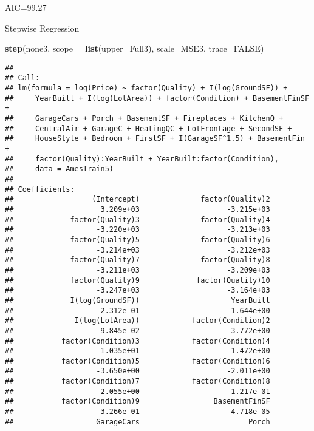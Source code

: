 \documentclass[
]{article}
\newenvironment{Shaded}{\begin{snugshade}}{\end{snugshade}}
\newcommand{\DataTypeTok}[1]{\textcolor[rgb]{0.13,0.29,0.53}{#1}}
\newcommand{\KeywordTok}[1]{\textcolor[rgb]{0.13,0.29,0.53}{\textbf{#1}}}
\newcommand{\NormalTok}[1]{#1}
\newcommand{\OtherTok}[1]{\textcolor[rgb]{0.56,0.35,0.01}{#1}}
\begin{document}
AIC=99.27

Stepwise Regression

\begin{Shaded}
\begin{Highlighting}[]
\KeywordTok{step}\NormalTok{(none3, }\DataTypeTok{scope =} \KeywordTok{list}\NormalTok{(}\DataTypeTok{upper=}\NormalTok{Full3), }\DataTypeTok{scale=}\NormalTok{MSE3, }\DataTypeTok{trace=}\OtherTok{FALSE}\NormalTok{)}
\end{Highlighting}
\end{Shaded}

\begin{verbatim}
## 
## Call:
## lm(formula = log(Price) ~ factor(Quality) + I(log(GroundSF)) + 
##     YearBuilt + I(log(LotArea)) + factor(Condition) + BasementFinSF + 
##     GarageCars + Porch + BasementSF + Fireplaces + KitchenQ + 
##     CentralAir + GarageC + HeatingQC + LotFrontage + SecondSF + 
##     HouseStyle + Bedroom + FirstSF + I(GarageSF^1.5) + BasementFin + 
##     factor(Quality):YearBuilt + YearBuilt:factor(Condition), 
##     data = AmesTrain5)
## 
## Coefficients:
##                  (Intercept)              factor(Quality)2  
##                    3.209e+03                    -3.215e+03  
##             factor(Quality)3              factor(Quality)4  
##                   -3.220e+03                    -3.213e+03  
##             factor(Quality)5              factor(Quality)6  
##                   -3.214e+03                    -3.212e+03  
##             factor(Quality)7              factor(Quality)8  
##                   -3.211e+03                    -3.209e+03  
##             factor(Quality)9             factor(Quality)10  
##                   -3.247e+03                    -3.164e+03  
##             I(log(GroundSF))                     YearBuilt  
##                    2.312e-01                    -1.644e+00  
##              I(log(LotArea))            factor(Condition)2  
##                    9.845e-02                    -3.772e+00  
##           factor(Condition)3            factor(Condition)4  
##                    1.035e+01                     1.472e+00  
##           factor(Condition)5            factor(Condition)6  
##                   -3.650e+00                    -2.011e+00  
##           factor(Condition)7            factor(Condition)8  
##                    2.055e+00                     1.217e-01  
##           factor(Condition)9                 BasementFinSF  
##                    3.266e-01                     4.718e-05  
##                   GarageCars                         Porch  

\end{verbatim}
\end{document}
